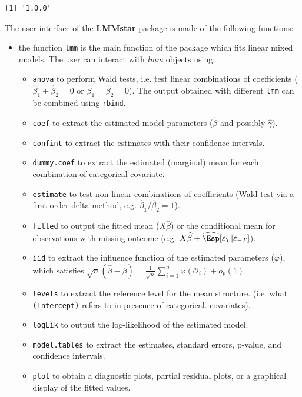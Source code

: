 \documentclass[12pt]{article}
\begin{document}
\begin{verbatim}
[1] '1.0.0'
\end{verbatim}


\clearpage

The user interface of the \textbf{LMMstar} package is made of the following
functions:
\begin{itemize}
\item the function \texttt{lmm} is the main function of the package which fits
linear mixed models. The user can interact with \emph{lmm} objects using:
\begin{itemize}
\item \texttt{anova} to perform Wald tests, i.e. test linear combinations of
coefficients (\(\widehat{\beta}_1+\widehat{\beta}_2=0\) or
\(\widehat{\beta}_1=\widehat{\beta}_2=0\)). The output obtained
with different \texttt{lmm} can be combined using \texttt{rbind}.
\item \texttt{coef} to extract the estimated model parameters (\(\widehat{\beta}\) and possibly \(\widehat{\gamma}\)).
\item \texttt{confint} to extract the estimates with their confidence intervals.
\item \texttt{dummy.coef} to extract the estimated (marginal) mean for each combination of categorical covariate.
\item \texttt{estimate} to test non-linear combinations of coefficients (Wald test via a first order delta method, e.g. \(\widehat{\beta}_1/\widehat{\beta}_2=1\)).
\item \texttt{fitted} to output the fitted mean (\(X\widehat{\beta}\)) or the
conditional mean for observations with missing outcome
(e.g. \(X\widehat{\beta} +
      \widehat{\Esp}[\varepsilon_T|\varepsilon_{-T}]\)).
\item \texttt{iid} to extract the influence function of the estimated
parameters (\(\varphi\)), which satisfies \newline
\(\sqrt{n}(\widehat{\beta}-\beta) = \frac{1}{\sqrt{n}}
      \sum_{i=1}^n \varphi\left(\mathcal{O}_i\right) +o_p(1)\)
\item \texttt{levels} to extract the reference level for the mean structure.
(i.e. what \texttt{(Intercept)} refers to in presence of categorical.
covariates).
\item \texttt{logLik} to output the log-likelihood of the estimated model.
\item \texttt{model.tables} to extract the estimates, standard errors, p-value, and confidence intervals.
\item \texttt{plot} to obtain a diagnostic plots, partial residual plots, or a graphical display of the fitted values.

\end{itemize}
\end{itemize}
\end{document}
